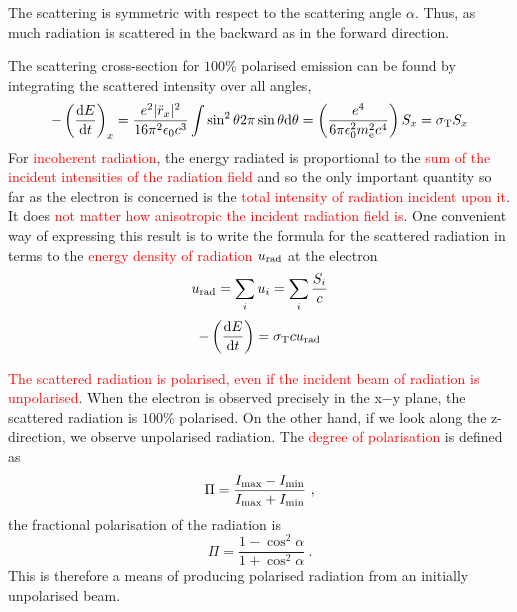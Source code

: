 \documentclass[12pt,a4paper]{article}
\newcommand{\dif}{\mathrm{d}}
\begin{document}
The scattering is symmetric with respect to the scattering angle $\alpha$. Thus, as much radiation is scattered in the backward as in the forward direction.

The scattering cross-section for $100\%$ polarised emission can be found by integrating the scattered intensity over all angles,
\begin{equation}
-\left(\frac{\dif E}{\dif t} \right)_x = \frac{e^2 |\ddot{r}_x|^2}{16 \pi^2 \epsilon_0 c^3} \int \sin^2 \theta 2\pi \sin \theta \dif \theta = \left(\frac{e^4}{6\pi \epsilon_0^2 m_{\rm e}^2 c^4} \right) S_x = \sigma_{\rm T} S_x
\end{equation}
For \textcolor{red}{incoherent radiation}, the energy radiated is proportional to the \textcolor{red}{sum of the incident intensities of the radiation field} and so the only important quantity so far as the electron is concerned is the \textcolor{red}{total intensity of radiation incident upon it}. It does \textcolor{red}{not matter how anisotropic the incident radiation field is}. One convenient way of expressing this result is to write the formula for the scattered radiation in terms to the \textcolor{red}{energy density of radiation $u_{\rm rad}$} at the electron
\begin{equation}
u_{\rm rad} = \sum_i u_i = \sum_i \frac{S_i}{c}
\end{equation}
\begin{equation}
-\left(\frac{\dif E}{\dif t} \right) = \sigma_{\rm T} c u_{\rm rad} 
\end{equation}

\textcolor{red}{The scattered radiation is polarised, even if the incident beam of radiation is unpolarised}. When the electron is observed precisely in the x−y plane, the scattered radiation is $100\%$ polarised. On the other hand, if we look along the z-direction, we observe unpolarised radiation. The \textcolor{red}{degree of polarisation} is defined as
\begin{equation}
\Pi = \frac{I_{\rm max} -I_{\rm min} }{I_{\rm max} +I_{\rm min} } ~,
\end{equation}
the fractional polarisation of the radiation is
\begin{equation}
\Pi = \frac{1 -\cos^2 \alpha}{1 +\cos^2 \alpha} ~.
\end{equation}
This is therefore a means of producing polarised radiation from an initially unpolarised beam.
\end{document}
